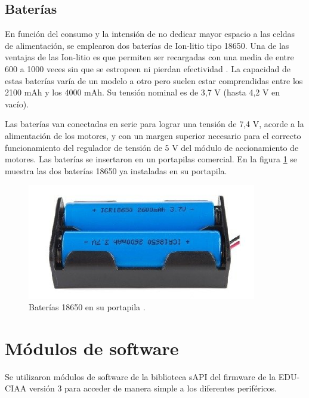 \subsection{Baterías}

En función del consumo y la intensión de no dedicar mayor espacio a las celdas de alimentación, se emplearon dos baterías de Ion-litio tipo 18650. Una de las ventajas de las Ion-litio es que permiten ser recargadas con una media de entre 600 a 1000 veces sin que se estropeen ni pierdan efectividad \citep{18650}. La capacidad de estas baterías varía de un modelo a otro pero suelen estar comprendidas entre los 2100 mAh y los 4000 mAh. Su tensión nominal es de 3,7 V (hasta 4,2 V en vacío).

Las baterías van conectadas en serie para lograr una tensión de 7,4 V, acorde a la alimentación de los motores, y con un margen superior necesario para el correcto funcionamiento del regulador de tensión de 5 V del módulo de accionamiento de motores. 
Las baterías se insertaron en un portapilas comercial. En la figura \ref{fig:portapila} se muestra las dos baterías 18650 ya instaladas en su portapila.


\begin{figure}[h]
	\centering
	\includegraphics[width=10cm]{./Figures/portapilas.PNG}
	\caption{Baterías 18650 en su portapila .}
	\label{fig:portapila}
\end{figure}



\section{Módulos de software}

Se utilizaron módulos de software de la biblioteca sAPI \citep{sapi} del firmware de la EDU-CIAA versión 3 para acceder de manera simple a los diferentes periféricos.



